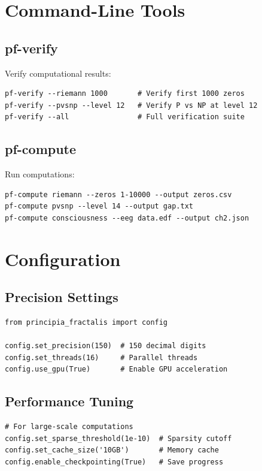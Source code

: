 \section{Command-Line Tools}

\subsection{pf-verify}

Verify computational results:

\begin{verbatim}
pf-verify --riemann 1000       # Verify first 1000 zeros
pf-verify --pvsnp --level 12   # Verify P vs NP at level 12
pf-verify --all                # Full verification suite
\end{verbatim}

\subsection{pf-compute}

Run computations:

\begin{verbatim}
pf-compute riemann --zeros 1-10000 --output zeros.csv
pf-compute pvsnp --level 14 --output gap.txt
pf-compute consciousness --eeg data.edf --output ch2.json
\end{verbatim}

\section{Configuration}

\subsection{Precision Settings}

\begin{verbatim}
from principia_fractalis import config

config.set_precision(150)  # 150 decimal digits
config.set_threads(16)     # Parallel threads
config.use_gpu(True)       # Enable GPU acceleration
\end{verbatim}

\subsection{Performance Tuning}

\begin{verbatim}
# For large-scale computations
config.set_sparse_threshold(1e-10)  # Sparsity cutoff
config.set_cache_size('10GB')       # Memory cache
config.enable_checkpointing(True)   # Save progress
\end{verbatim}

